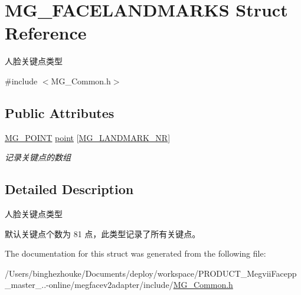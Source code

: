 \hypertarget{struct_m_g___f_a_c_e_l_a_n_d_m_a_r_k_s}{}\section{M\+G\+\_\+\+F\+A\+C\+E\+L\+A\+N\+D\+M\+A\+R\+KS Struct Reference}
\label{struct_m_g___f_a_c_e_l_a_n_d_m_a_r_k_s}


人脸关键点类型  




{\ttfamily \#include $<$M\+G\+\_\+\+Common.\+h$>$}

\subsection*{Public Attributes}
\begin{DoxyCompactItemize}
\item 
\mbox{\label{struct_m_g___f_a_c_e_l_a_n_d_m_a_r_k_s_ab6b0978643fc40c17871d3d2ca4023b1}} 
\hyperlink{struct_m_g___p_o_i_n_t}{M\+G\+\_\+\+P\+O\+I\+NT} \hyperlink{struct_m_g___f_a_c_e_l_a_n_d_m_a_r_k_s_ab6b0978643fc40c17871d3d2ca4023b1}{point} \mbox{[}\hyperlink{_m_g___common_8h_ab08016a1354ce3e4cc1a63b0ca4c7bb5}{M\+G\+\_\+\+L\+A\+N\+D\+M\+A\+R\+K\+\_\+\+NR}\mbox{]}
\begin{DoxyCompactList}\small\item\em 记录关键点的数组 \end{DoxyCompactList}\end{DoxyCompactItemize}


\subsection{Detailed Description}
人脸关键点类型 

默认关键点个数为 81 点，此类型记录了所有关键点。 

The documentation for this struct was generated from the following file\+:\begin{DoxyCompactItemize}
\item 
/\+Users/binghezhouke/\+Documents/deploy/workspace/\+P\+R\+O\+D\+U\+C\+T\+\_\+\+Megvii\+Facepp\+\_\+master\+\_..-\/online/megfacev2adapter/include/\hyperlink{_m_g___common_8h}{M\+G\+\_\+\+Common.\+h}\end{DoxyCompactItemize}
